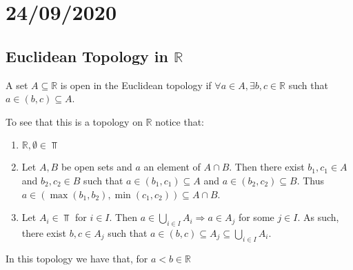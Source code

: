 \documentclass[../../main/main.tex]{subfiles}
\begin{document}
\chapter{24/09/2020}
\label{cpt:lec2}

\section{Euclidean Topology in $\mathbb{R}$}
\label{sec:euclidean-topology}

\begin{definition}
  A set $A \subseteq \mathbb{R}$ is open in the Euclidean topology if $\forall a \in A, \exists b, c \in \mathbb{R}$ such that $a \in (b, c) \subseteq A$.
\end{definition}

To see that this is a topology on $\mathbb{R}$ notice that:

\begin{enumerate}
  \item $\mathbb{R}, \emptyset \in \Top$
  \item Let $A, B$ be open sets and $a$ an element of $A \cap B$. Then there exist $b_{1}, c_{1} \in A$ and $b_{2}, c_{2} \in B$ such that $a \in (b_{1}, c_{1}) \subseteq A$ and $a \in (b_{2}, c_{2}) \subseteq B$. Thus $a \in \left( \max (b_{1}, b_{2}), \min (c_{1}, c_{2}) \right) \subseteq A \cap B$.
  \item Let $A_{i} \in \Top$ for $i \in I$. Then $a \in \bigcup_{i \in I} A_{i} \Rightarrow a \in A_{j}$ for some $j \in I$. As such, there exist $b, c \in A_{j}$ such that $a \in \left( b, c \right) \subseteq A_{j} \subseteq \bigcup_{i \in I} A_{i}$.
\end{enumerate}

In this topology we have that, for $a < b \in \mathbb{R}$
\end{document}
